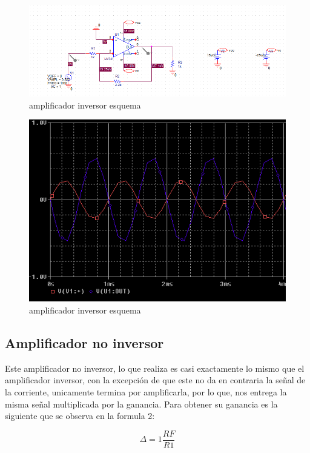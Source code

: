 \documentclass[11pt,a4paper]{article}
\begin{document}
\begin{figure}[ht]
\begin{center}
\includegraphics[scale=0.5]{1.PNG}
\caption{amplificador inversor esquema}
\end{center}
\end{figure}
\begin{figure}[h]
\begin{center}
\includegraphics[scale=0.5]{2.PNG}
\caption{amplificador inversor esquema}
\end{center}
\end{figure}
\subsection{Amplificador no inversor}

Este amplificador no inversor, lo que realiza es casi exactamente lo mismo que el amplificador inversor, con la excepción de que este no da en contraria la señal de la corriente, unicamente termina por amplificarla, por lo que, nos entrega la misma señal multiplicada por la ganancia. Para obtener su ganancia es la siguiente que se observa en la formula 2:

\begin{equation}
\Delta=1\frac{RF}{R1}
\end{equation}
\end{document}
